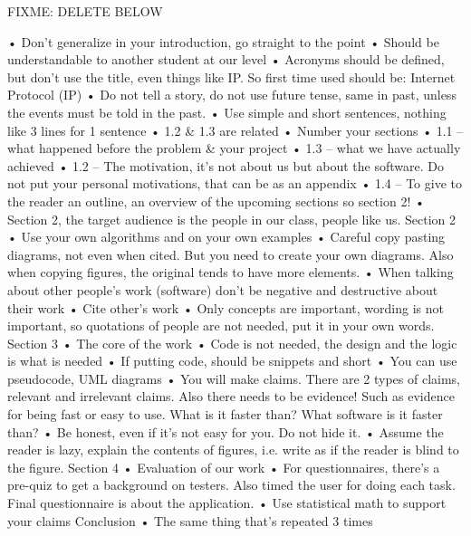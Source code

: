 \documentclass[12pt]{article}
\begin{document}
FIXME: DELETE BELOW

•	Don’t generalize in your introduction, go straight to the point
•	Should be understandable to another student at our level
•	Acronyms should be defined, but don’t use the title, even things like IP. So first time used should be: Internet Protocol (IP)
•	Do not tell a story, do not use future tense, same in past, unless the events must be told in the past.
•	Use simple and short sentences, nothing like 3 lines for 1 sentence
•	1.2 \& 1.3 are related
•	 Number your sections
•	1.1 – what happened before the problem \& your project
•	1.3 – what we have actually achieved
•	1.2 – The motivation, it’s not about us but about the software. Do not put your personal motivations, that can be as an appendix
•	1.4 – To give to the reader an outline, an overview of the upcoming sections so section 2!
•	Section 2, the target audience is the people in our class, people like us.
Section 2
•	Use your own algorithms and on your own examples
•	Careful copy pasting diagrams, not even when cited. But you need to create your own diagrams. Also when copying figures, the original tends to have more elements.
•	When talking about other people’s work (software) don’t be negative and destructive about their work
•	Cite other’s work
•	Only concepts are important, wording is not important, so quotations of people are not needed, put it in your own words.
 
Section 3
•	The core of the work
•	Code is not needed, the design and the logic is what is needed
•	If putting code, should be snippets and short
•	You can use pseudocode, UML diagrams
•	You will make claims. There are 2 types of claims, relevant and irrelevant claims. Also there needs to be evidence! Such as evidence for being fast or easy to use. What is it faster than? What software is it faster than?
•	Be honest, even if it’s not easy for you. Do not hide it.
•	Assume the reader is lazy, explain the contents of figures, i.e. write as if the reader is blind to the figure.
Section 4
•	Evaluation of our work
•	For questionnaires, there’s a pre-quiz to get a background on testers. Also timed the user for doing each task. Final questionnaire is about the application.
•	Use statistical math to support your claims
Conclusion
•	The same thing that’s repeated 3 times
\end{document}
